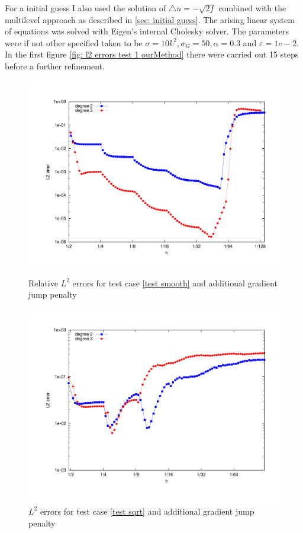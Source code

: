 For a initial guess I also used the solution of $\triangle u = -\sqrt{2f}$ combined with the multilevel approach as described in \ref{sec: initial guess}.
The arising linear system of equations was solved with Eigen's internal Cholesky solver.
The parameters were if not other specified taken to be $\sigma=10 k^2, \sigma_G = 50, \alpha =
0.3$ and $\varepsilon = 1e-2$.
In the first figure \ref{fig: l2 errors test 1 ourMethod} there were carried out 15 steps before a further refinement.

\begin{figure}[h!]
	\includegraphics[scale =0.5]{plots/MA1.pdf}
	\caption{Relative $L^2$ errors for test case \ref{test smooth} and additional gradient jump penalty}
	\label{fig: l2 errors test smooth ourMethod}
\end{figure}

\begin{figure}[h!]
	\includegraphics[scale =0.5]{plots/MA3.pdf}
	\caption{$L^2$ errors for test case \ref{test sqrt} and additional gradient jump penalty}
	\label{fig: l2 errors test sqrt ourMethod}
\end{figure}


